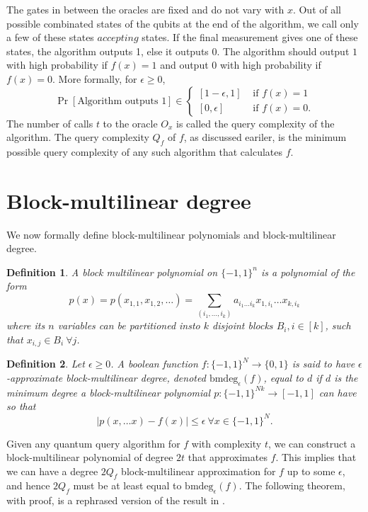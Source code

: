\documentclass[12pt]{report}
\newtheorem{definition}{Definition}
\newcommand{\bmdeg}{\mathrm{bmdeg}}
\begin{document}
The gates in between the oracles are fixed and do not vary with $x$. Out of all possible combinated states of the qubits at the end of the algorithm, we call only a few of these states $\textit{accepting}$ states. If the final measurement gives one of these states, the algorithm outputs 1, else it outputs 0. The algorithm should output $1$ with high probability if $f(x)=1$ and output $0$ with high probability if $f(x)=0$. More formally, for $\epsilon \geq 0$,
\[
\Pr[\text{Algorithm outputs 1}] \in \begin{cases}
    [1 - \epsilon, 1] & \text{ if }f(x) = 1 \\
    [0, \epsilon] & \text{ if }f(x) = 0.
\end{cases}
\]
The number of calls $t$ to the oracle $O_x$ is called the query complexity of the algorithm. The query complexity $Q_f$ of $f$, as discussed eariler, is the minimum possible query complexity of any such algorithm that calculates $f$.

\section{Block-multilinear degree}
We now formally define block-multilinear polynomials and block-multilinear degree.

\begin{definition}
A block multilinear polynomial on $\{-1,1\}^n$ is a polynomial of the form $$p(x) = p(x_{1,1}, x_{1,2}, \ldots) = \sum_{(i_1, \ldots, i_k)} a_{i_1 \ldots i_k} x_{1,i_1} \ldots x_{k,i_k}$$ where its $n$ variables can be partitioned insto $k$ disjoint blocks $B_i, i \in [k]$, such that $x_{i,j} \in B_i ~\forall j$. 
\end{definition}

\begin{definition}
Let $\epsilon \geq 0$. A boolean function $f\colon \{-1,1\}^N \rightarrow \{0,1\}$ is said to have $\epsilon$-approximate block-multilinear degree, denoted $\bmdeg_\epsilon(f)$, equal to $d$ if $d$ is the minimum degree a block-multilinear polynomial $p\colon \{-1,1\}^{Nk} \rightarrow [-1,1]$ can have so that $$
|p(x, \ldots x) - f(x)| \leq \epsilon ~\forall x \in \{-1,1\}^N.
$$
\end{definition}

Given any quantum query algorithm for $f$ with complexity $t$, we can construct a block-multilinear polynomial of degree $2t$ that approximates $f$. This implies that we can have a degree $2Q_f$ block-multilinear approximation for $f$ up to some $\epsilon$, and hence $2Q_f$ must be at least equal to $\bmdeg_\epsilon(f)$. The following theorem, with proof, is a rephrased version of the result in \cite{paper1}.
\end{document}
